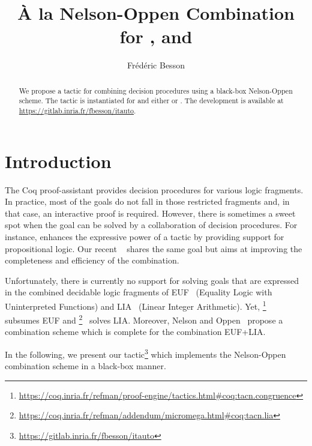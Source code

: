 \documentclass{easychair}
\title{À la Nelson-Oppen Combination for \icoq{congruence}, \icoq{lia} and \icoq{lra}}
\author{ Frédéric Besson}
\institute{Inria, Rennes, France}
\begin{document}
\maketitle

\begin{abstract}
  We propose a tactic for combining decision procedures using a
  black-box Nelson-Oppen scheme.
  The tactic is instantiated for  and either  or .
  The development is available at \url{https://gitlab.inria.fr/fbesson/itauto}.
\end{abstract}


\section{Introduction}
\label{sect:introduction}

The Coq proof-assistant provides decision procedures for various logic
fragments. In practice, most of the goals do not fall in those
restricted fragments and, in that case, an interactive proof is
required.
%
However, there is sometimes a sweet spot when the goal can be solved by a
collaboration of decision procedures.
%
For instance,  enhances the expressive power of a
tactic  by providing support for propositional logic.  Our
recent ~\cite{Itauto} shares the same goal but aims at improving the
completeness and efficiency of the combination.
%

Unfortunately, there is currently no support for solving goals that are
expressed in the combined decidable logic fragments of EUF~\cite{Ackermann} (Equality Logic with
Uninterpreted Functions) and LIA~\cite{presburger} (Linear Integer Arithmetic).
%
Yet, \footnote{\url{https://coq.inria.fr/refman/proof-engine/tactics.html\#coq:tacn.congruence}}~\cite{Corbineau06} subsumes EUF and \footnote{\url{https://coq.inria.fr/refman/addendum/micromega.html\#coq:tacn.lia}}~\cite{BessonCP11,Besson06} solves LIA.
Moreover, Nelson and Oppen~\cite{NelsonO79} propose a combination scheme which is complete for the combination EUF+LIA.

In the following, we present our 
tactic\footnote{\url{https://gitlab.inria.fr/fbesson/itauto}} which implements the Nelson-Oppen combination scheme in a black-box manner.
\end{document}
